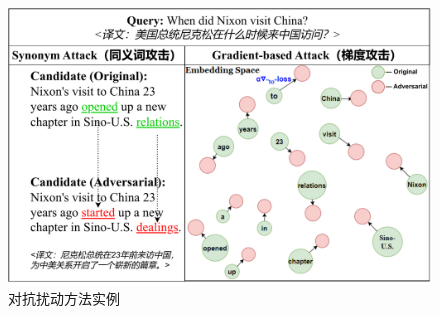 \begin{figure}[!h]
  \centering
    \includegraphics[width=0.9\columnwidth]{fig/fig3-1.pdf}
  \caption{对抗扰动方法实例}
  \label{fig3-1}
\end{figure}